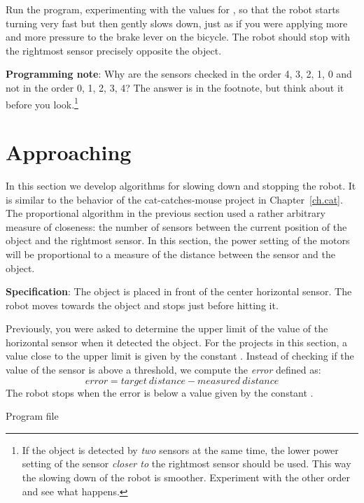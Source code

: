 Run the program, experimenting with the values for ,
so that the robot starts turning very fast but then gently
slows down, just as if you were applying more and more pressure to the
brake lever on the bicycle. The robot should stop with the rightmost
sensor precisely opposite the object.

\textbf{Programming note}: Why are the sensors checked in the order 4,
3, 2, 1, 0 and not in the order 0, 1, 2, 3, 4? The answer is in the
footnote, but think about it before you look.\footnote{If the object
is detected by \emph{two} sensors at the same time, the lower power
setting of the sensor \emph{closer to} the rightmost sensor should be
used. This way the slowing down of the robot is smoother. Experiment
with the other order and see what happens.}


\section{Approaching}

In this section we develop algorithms for slowing down and stopping the
robot. It is similar to the  behavior of the
cat-catches-mouse project in Chapter~\ref{ch.cat}. The proportional
algorithm in the previous section used a rather arbitrary measure of
closeness: the number of sensors between the current position of the
object and the rightmost sensor. In this section, the power setting of
the motors will be proportional to a measure of the distance between the
sensor and the object.

\textbf{Specification}: The object is placed in front of the center
horizontal sensor. The robot moves towards the object and
stops just before hitting it.

Previously, you were asked to determine the upper limit of the value of
the horizontal sensor when it detected the object. For the
projects in this section, a value close to the upper limit is
given by the constant . Instead of checking if the value of
the sensor is above a threshold, we compute the \emph{error} defined as:
\begin{displaymath}
\mathit{error} = \mathit{target\ distance} - \mathit{measured\ distance} 
\end{displaymath}
The robot stops when the error is below a value given by the constant
.

\label{s.on-off}

{\raggedleft \hfill Program file }

